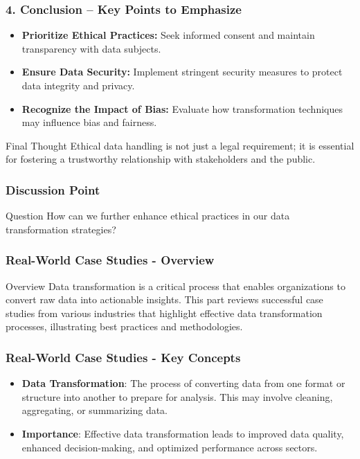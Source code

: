 \documentclass[aspectratio=169]{beamer}
\begin{document}
\begin{frame}[fragile]
    \frametitle{4. Conclusion – Key Points to Emphasize}
    \begin{itemize}
        \item \textbf{Prioritize Ethical Practices:} Seek informed consent and maintain transparency with data subjects.
        \item \textbf{Ensure Data Security:} Implement stringent security measures to protect data integrity and privacy.
        \item \textbf{Recognize the Impact of Bias:} Evaluate how transformation techniques may influence bias and fairness.
    \end{itemize}
    
    \begin{block}{Final Thought}
        Ethical data handling is not just a legal requirement; it is essential for fostering a trustworthy relationship with stakeholders and the public.
    \end{block}
\end{frame}

\begin{frame}[fragile]
    \frametitle{Discussion Point}
    \begin{block}{Question}
        How can we further enhance ethical practices in our data transformation strategies?
    \end{block}
\end{frame}

\begin{frame}[fragile]
    \frametitle{Real-World Case Studies - Overview}
    \begin{block}{Overview}
        Data transformation is a critical process that enables organizations to convert raw data into actionable insights. 
        This part reviews successful case studies from various industries that highlight effective data transformation processes, illustrating best practices and methodologies.
    \end{block}
\end{frame}

\begin{frame}[fragile]
    \frametitle{Real-World Case Studies - Key Concepts}
    \begin{itemize}
        \item \textbf{Data Transformation}: The process of converting data from one format or structure into another to prepare for analysis. This may involve cleaning, aggregating, or summarizing data.
        \item \textbf{Importance}: Effective data transformation leads to improved data quality, enhanced decision-making, and optimized performance across sectors.
    \end{itemize}
\end{frame}
\end{document}
